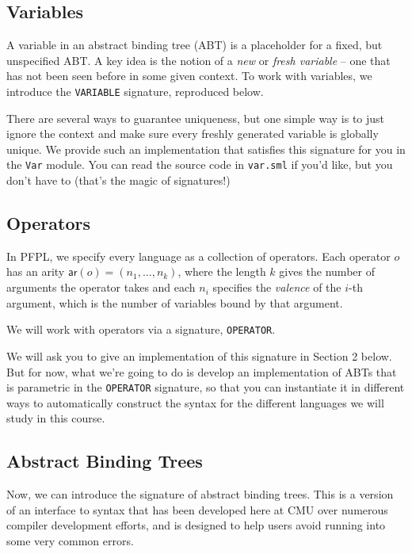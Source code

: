 \documentclass[11pt]{article}
\begin{document}
\subsection{Variables}

A variable in an abstract binding tree (ABT) is a placeholder for a fixed, but unspecified ABT. A key idea is the notion of a \emph{new} or \emph{fresh variable} -- one that has not been seen before in some given context. To work with variables, we introduce the \verb|VARIABLE| signature, reproduced below.



There are several ways to guarantee uniqueness, but one simple way is to just ignore the context and make sure every freshly generated variable is globally unique.  We provide such an implementation that satisfies this signature for you in the \verb|Var| module. You can read the source code in \verb|var.sml| if you'd like, but you don't have to (that's the magic of signatures!)

\subsection{Operators}

In PFPL, we specify
every language as a collection of operators. Each operator $o$
has an arity $\mathsf{ar}(o) = (n_1, \ldots, n_k)$, where the length $k$
gives the number of arguments the operator takes and each $n_i$ specifies the \emph{valence}
of the $i$-th argument, which is the number of variables bound
by that argument.

We will work with operators via a signature, \verb|OPERATOR|.



We will ask you to give an implementation of this signature in Section 2 below. But for now, what we're going to do is develop an
implementation of ABTs that is parametric in the \verb|OPERATOR| signature,
so that you can instantiate it in different ways to automatically construct the syntax
for the different languages we will study in this course.

\subsection{Abstract Binding Trees}

Now, we can introduce the signature of abstract binding
trees. This is a version
of an interface to syntax that has been developed here at CMU over
numerous compiler development efforts, and is designed to help
users avoid running into some very common errors.
\end{document}

